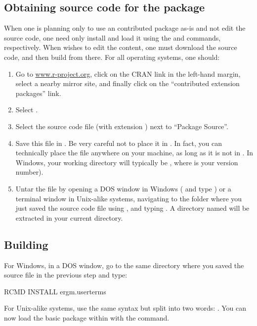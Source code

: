 \documentclass[nojss]{jss}
\begin{document}
\subsection[Obtaining source code for the ergm.userterms package]{Obtaining source code for the  package}
\label{Source}

When one is planning only to use an  contributed package as-is and
not edit the source code, one need only install and load it using the  and  commands, respectively.
When wishes to edit the content, one must download the source code,
and then build from there. For all operating systems, one should:

\begin{enumerate}
\item Go to \url{www.r-project.org}, click on the CRAN link in the left-hand margin,
select a nearby mirror site, and finally click on the ``contributed extension packages''
link.
\item Select .
\item Select the source code file (with extension ) next to ``Package Source''.
\item Save this file in .  Be very careful not to place it in . In fact, you can technically place the file anywhere on your machine, as long as it is not in .  In Windows, your  working directory will typically be , where  is your  version number).
\item Untar the file by opening a DOS window in
Windows ( and type ) or a terminal window in
Unix-alike systems,
navigating to the folder where you just saved the source code file
using , and typing .
A directory named  will be extracted in your current directory.
\end{enumerate}

\subsection[Building ergm.userterms]{Building }
\label{BuildEUT}

For Windows, in a DOS window, go to the same directory where you saved the  source file in the previous step and type:
\begin{CodeChunk}
\begin{CodeInput}
RCMD INSTALL ergm.userterms
\end{CodeInput}
\end{CodeChunk}
For Unix-alike systems, use the same syntax but split 
into two words: .
You can now load the basic  package within  with the  command.
\end{document}

